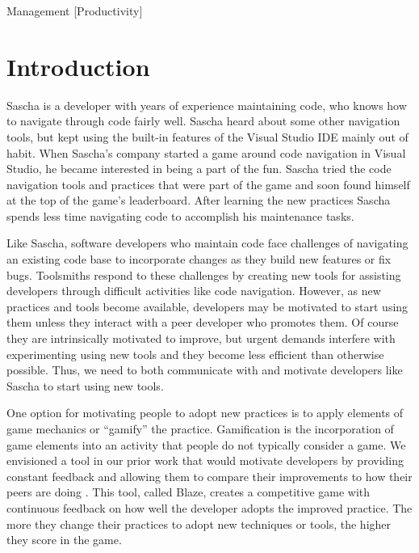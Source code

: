 \documentclass{sig-alternate}
\begin{document}
 {Management} [Productivity]



\section{Introduction}

Sascha is a developer with years of experience maintaining code, who knows how to navigate through code fairly well.  Sascha heard about some other navigation tools, but kept using the built-in features of the Visual Studio IDE mainly out of habit.  When Sascha's company started a game around code navigation in Visual Studio, he became interested in being a part of the fun.  Sascha tried the code navigation tools and practices that were part of the game and soon found himself at the top of the game's leaderboard.  After learning the new practices Sascha spends less time navigating code to accomplish his maintenance tasks.

Like Sascha, software developers who maintain code face challenges of navigating an existing code base to incorporate changes as they build new features or fix bugs.  Toolsmiths respond to these challenges by creating new tools for assisting developers through difficult activities like code navigation.  However, as new practices and tools become available, developers may be motivated to start using them unless they interact with a peer developer who promotes them\cite{wbsnipes:Hill2011Peer}.    Of course they are intrinsically motivated to improve, but urgent demands interfere with experimenting using new tools and they become less efficient than otherwise possible.  Thus, we need to both communicate with and motivate developers like Sascha to start using new tools.  

One option for motivating people to adopt new practices is to apply elements of game mechanics or ``gamify'' the practice. Gamification is the incorporation of game elements into an activity that people do not typically consider a game\cite{2013Oxford}.  We envisioned a tool in our prior work that would motivate developers by providing constant feedback and allowing them to compare their improvements to how their peers are doing  \cite{Snipes2013Towards}.  This tool, called Blaze, creates a competitive game with continuous feedback on how well the developer adopts the improved practice.  The more they change their practices to adopt new techniques or tools, the higher they score in the game. 
\end{document}
